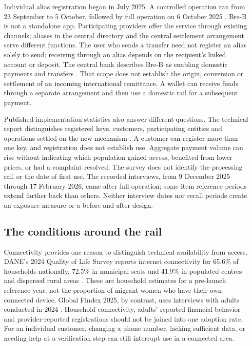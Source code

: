 Individual alias registration began in July 2025. A controlled operation ran from 23 September to 5 October, followed by full operation on 6 October 2025 \citep{banreppilot,banreptechnical2026,banrep2026}. Bre-B is not a standalone app. Participating providers offer the service through existing channels; aliases in the central directory and the central settlement arrangement serve different functions. The user who sends a transfer need not register an alias solely to send; receiving through an alias depends on the recipient's linked account or deposit. The central bank describes Bre-B as enabling domestic payments and transfers \citep{banrepfaq,banreptechnical2026}. That scope does not establish the origin, conversion or settlement of an incoming international remittance. A wallet can receive funds through a separate arrangement and then use a domestic rail for a subsequent payment.

Published implementation statistics also answer different questions. The technical report distinguishes registered keys, customers, participating entities and operations settled on the new mechanism \citep{banreptechnical2026}. A customer can register more than one key, and registration does not establish use. Aggregate payment volume can rise without indicating which population gained access, benefited from lower prices, or had a complaint resolved. The survey does not identify the processing rail or the date of first use. The recorded interviews, from 9 December 2025 through 17 February 2026, came after full operation; some item reference periods extend farther back than others. Neither interview dates nor recall periods create an exposure measure or a before-and-after design.

\subsection{The conditions around the rail}
Connectivity provides one reason to distinguish technical availability from access. DANE's 2024 Quality of Life Survey reports internet connectivity for 65.6\% of households nationally, 72.5\% in municipal seats and 41.9\% in populated centres and dispersed rural areas \citep{daneentic2025}. These are household estimates for a pre-launch reference year, not the proportion of migrant women who have their own connected device. Global Findex 2025, by contrast, uses interviews with adults conducted in 2024 \citep{findex2025}. Household connectivity, adults' reported financial behavior and provider-reported registrations should not be joined into one adoption rate. For an individual customer, changing a phone number, lacking sufficient data, or needing help at a verification step can still interrupt use in a connected area.

